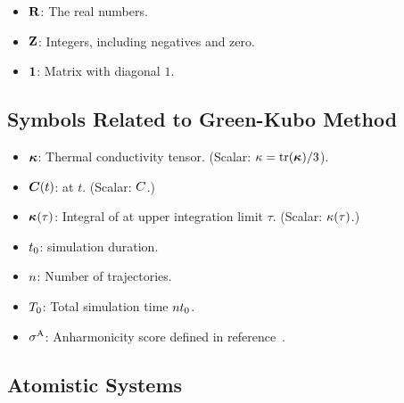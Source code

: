 \begin{itemize}
	\item ${\bf R}$: The real numbers.
	\item ${\bf Z}$: Integers, including negatives and zero.
	\item ${\bf 1}$: Matrix with diagonal $1$.
\end{itemize}

\subsection{Symbols Related to Green-Kubo Method}

\begin{itemize}
	\item $\boldsymbol{\kappa}$: Thermal conductivity tensor. (Scalar: $\kappa=\text{tr}(\boldsymbol{\kappa})/3$).
	\item $\boldsymbol{C}(t)$: \hfacf at $t$. (Scalar: $C$.)
	\item $\boldsymbol{\kappa}(\tau)$: Integral of \hfacf at upper integration limit $\tau$. (Scalar: $\kappa(\tau)$.)
	\item $t_0$: \md simulation duration.
	\item $n$: Number of trajectories.
	\item $T_0$: Total simulation time $n t_0$.
	\item $\sigma^{\text{A}}$: Anharmonicity score defined in reference~\cite{kpsc2020t}.
\end{itemize}

\subsection{Atomistic Systems}

